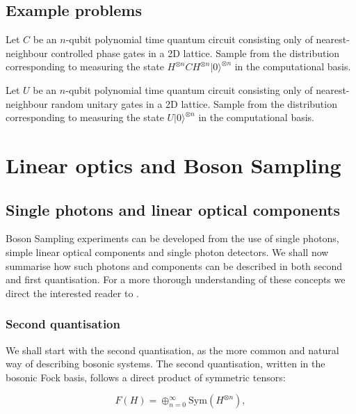 \subsection{Example problems}
\label{ssec:qa-examples}

\begin{problem} Let $C$ be an $n$-qubit polynomial time quantum circuit consisting only of nearest-neighbour controlled phase gates in a 2D lattice. Sample from the distribution corresponding to measuring the state $H^{\otimes n}CH^{\otimes n}|0\rangle^{\otimes n}$ in the computational basis.
\end{problem}

\begin{problem} Let $U$ be an $n$-qubit polynomial time quantum circuit consisting only of nearest-neighbour random unitary gates in a 2D lattice. Sample from the distribution corresponding to measuring the state $U|0\rangle^{\otimes n}$ in the computational basis.
\end{problem}

\section{Linear optics and Boson Sampling}

\subsection{Single photons and linear optical components}

Boson Sampling experiments can be developed from the use of single photons, simple linear optical components and single photon detectors. We shall now summarise how such photons and components can be described in both second and first quantisation. For a more thorough understanding of these concepts we direct the interested reader to \cite{fox2006}.

\subsubsection{Second quantisation}

We shall start with the second quantisation, as the more common and natural way of describing bosonic systems. The second quantisation, written in the bosonic Fock basis, follows a direct product of symmetric tensors:

\begin{equation}
F(H) = \oplus_{n=0}^\infty\textrm{Sym}(H^{\otimes n}),
\end{equation}

